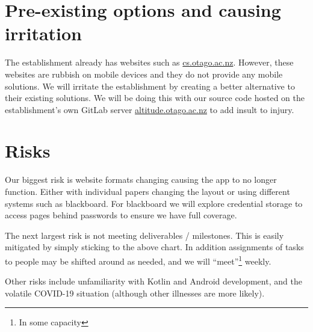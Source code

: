 \documentclass{article}
\begin{document}
	\section{Pre-existing options and causing irritation}
	
	The establishment already has websites such as \url{cs.otago.ac.nz}. However, these websites are rubbish on mobile devices and they do not provide any mobile solutions. We will irritate the establishment by creating a better alternative to their existing solutions. We will be doing this with our source code hosted on the establishment's own GitLab server \url{altitude.otago.ac.nz} to add insult to injury.
	
	\section{Risks}
	
	Our biggest risk is website formats changing causing the app to no longer function. Either with individual papers changing the layout or using different systems such as blackboard. For blackboard we will explore credential storage to access pages behind passwords to ensure we have full coverage.
	
	The next largest risk is not meeting deliverables / milestones. This is easily mitigated by simply sticking to the above chart. In addition assignments of tasks to people may be shifted around as needed, and we will ``meet''\footnote{In some capacity} weekly.
	
	Other risks include unfamiliarity with Kotlin and Android development, and the volatile COVID-19 situation (although other illnesses are more likely).
\end{document}
